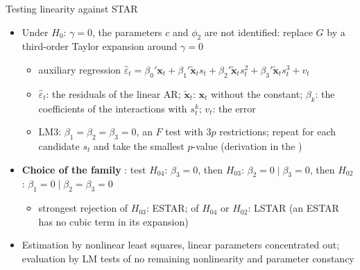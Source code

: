 \begin{frame}{Testing linearity against STAR}
\itemsize{\small}
\begin{itemize}
    \item Under $H_0$: $\gamma = 0$, the parameters $c$ and $\phi_2$ are not identified: replace $G$ by a third-order Taylor expansion around $\gamma = 0$ 
    \begin{itemize}
        \item auxiliary regression $\hat\varepsilon_t = \beta_0'\mathbf x_t + \beta_1'\tilde{\mathbf x}_t s_t + \beta_2'\tilde{\mathbf x}_t s_t^2 + \beta_3'\tilde{\mathbf x}_t s_t^3 + v_t$
        \item $\hat\varepsilon_t$: the residuals of the linear AR; $\tilde{\mathbf x}_t$: $\mathbf x_t$ without the constant; $\beta_k$: the coefficients of the interactions with $s_t^k$; $v_t$: the error
        \item LM3: $\beta_1 = \beta_2 = \beta_3 = 0$, an $F$ test with $3p$ restrictions; repeat for each candidate $s_t$ and take the smallest $p$-value (derivation in the )
    \end{itemize}
    \item \textbf{Choice of the family} : test $H_{04}$: $\beta_3 = 0$, then $H_{03}$: $\beta_2 = 0 \mid \beta_3 = 0$, then $H_{02}$: $\beta_1 = 0 \mid \beta_2 = \beta_3 = 0$
    \begin{itemize}
        \item strongest rejection of $H_{03}$: ESTAR; of $H_{04}$ or $H_{02}$: LSTAR (an ESTAR has no cubic term in its expansion)
    \end{itemize}
    \item Estimation by nonlinear least squares, linear parameters concentrated out; evaluation by LM tests of no remaining nonlinearity and parameter constancy 
\end{itemize}
\end{frame}


